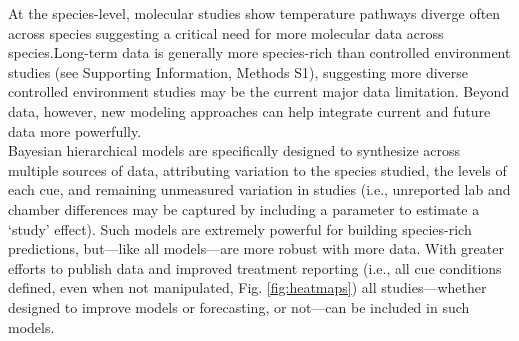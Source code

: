 \documentclass[11pt,letter]{article}
\begin{document}
At the species-level, molecular studies show temperature pathways diverge often across species \citep[in contrast, photoperiodic control appears highly conserved,][]{Satake2022} suggesting a critical need for more molecular data across species.Long-term data is generally more species-rich than controlled environment studies (see Supporting Information, Methods S1), suggesting more diverse controlled environment studies may be the current major data limitation. Beyond data, however, new modeling approaches can help integrate current and future data more powerfully. \\

Bayesian hierarchical models are specifically designed to synthesize across multiple sources of data, attributing variation to the species studied, the levels of each cue, and remaining unmeasured variation in studies (i.e., unreported lab and chamber differences may be captured by including a parameter to estimate a `study' effect). Such models are extremely powerful for building species-rich predictions, but---like all models---are more robust with more data. With greater efforts to publish data and improved treatment reporting (i.e., all cue conditions defined, even when not manipulated, Fig. \ref{fig:heatmaps}) all studies---whether designed to improve models or forecasting, or not---can be included in such models. 


\end{document}
